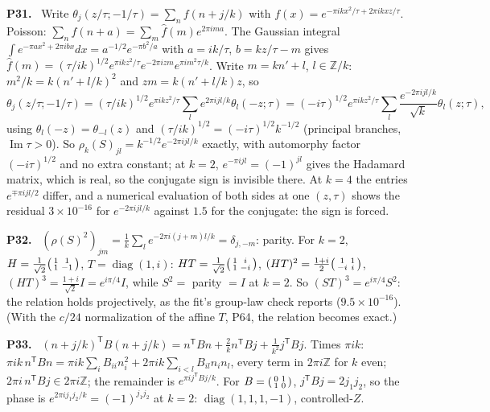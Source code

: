 \documentclass[11pt]{article}
\newcommand{\Z}{\mathbb{Z}}
\newenvironment{solution}[1]{\medskip\noindent\textbf{P#1.}\ }{\par\medskip}
\begin{document}
\begin{solution}{31}
Write $\theta_j(z/\tau;-1/\tau) = \sum_n f(n+j/k)$ with
$f(x) = e^{-\pi ikx^2/\tau + 2\pi ikxz/\tau}$. Poisson: $\sum_n f(n+a) = \sum_m\hat f(m)e^{2\pi ima}$.
The Gaussian integral $\int e^{-\pi ax^2+2\pi ibx}dx = a^{-1/2}e^{-\pi b^2/a}$ with
$a = ik/\tau$, $b = kz/\tau - m$ gives
$\hat f(m) = (\tau/ik)^{1/2}e^{\pi ikz^2/\tau}e^{-2\pi izm}e^{\pi im^2\tau/k}$.
Write $m = kn'+l$, $l\in\Z/k$: $m^2/k = k(n'+l/k)^2$ and $zm = k(n'+l/k)z$, so
\[
  \theta_j(z/\tau;-1/\tau) = (\tau/ik)^{1/2}e^{\pi ikz^2/\tau}\sum_l e^{2\pi ijl/k}\theta_l(-z;\tau)
  = (-i\tau)^{1/2}e^{\pi ikz^2/\tau}\sum_l \frac{e^{-2\pi ijl/k}}{\sqrt k}\theta_l(z;\tau),
\]
using $\theta_l(-z) = \theta_{-l}(z)$ and $(\tau/ik)^{1/2} = (-i\tau)^{1/2}k^{-1/2}$
(principal branches, $\operatorname{Im}\tau>0$). So $\rho_k(S)_{jl} = k^{-1/2}e^{-2\pi ijl/k}$
exactly, with automorphy factor $(-i\tau)^{1/2}$ and no extra constant; at $k=2$,
$e^{-\pi ijl} = (-1)^{jl}$ gives the Hadamard matrix, which is real, so the
conjugate sign is invisible there. At $k = 4$ the entries $e^{\mp\pi ijl/2}$
differ, and a numerical evaluation of both sides at one $(z,\tau)$ shows the
residual $3\times10^{-16}$ for $e^{-2\pi ijl/k}$ against $1.5$ for the
conjugate: the sign is forced.
\end{solution}

\begin{solution}{32}
$(\rho(S)^2)_{jm} = \frac1k\sum_l e^{-2\pi i(j+m)l/k} = \delta_{j,-m}$: parity.
For $k=2$, $H = \frac1{\sqrt2}\begin{psmallmatrix}1&1\\1&-1\end{psmallmatrix}$,
$T = \operatorname{diag}(1,i)$: $HT = \frac1{\sqrt2}\begin{psmallmatrix}1&i\\1&-i\end{psmallmatrix}$,
$(HT)^2 = \frac{1+i}{2}\begin{psmallmatrix}1&1\\-i&i\end{psmallmatrix}$,
$(HT)^3 = \frac{1+i}{\sqrt2}I = e^{i\pi/4}I$, while $S^2 = $ parity $= I$ at $k=2$.
So $(ST)^3 = e^{i\pi/4}S^2$: the relation holds projectively, as the fit's
group-law check reports ($9.5\times10^{-16}$). (With the $c/24$ normalization
of the affine $T$, P64, the relation becomes exact.)
\end{solution}

\begin{solution}{33}
$(n+j/k)^{\mathsf T}B(n+j/k) = n^{\mathsf T}Bn + \tfrac2k n^{\mathsf T}Bj + \tfrac1{k^2}j^{\mathsf T}Bj$.
Times $\pi ik$: $\pi ik\,n^{\mathsf T}Bn = \pi ik\sum_iB_{ii}n_i^2 + 2\pi ik\sum_{i<l}B_{il}n_in_l$,
every term in $2\pi i\Z$ for $k$ even; $2\pi i\,n^{\mathsf T}Bj\in2\pi i\Z$; the
remainder is $e^{\pi ij^{\mathsf T}Bj/k}$. For $B = \begin{psmallmatrix}0&1\\1&0\end{psmallmatrix}$,
$j^{\mathsf T}Bj = 2j_1j_2$, so the phase is $e^{2\pi ij_1j_2/k} = (-1)^{j_1j_2}$ at
$k=2$: $\operatorname{diag}(1,1,1,-1)$, controlled-$Z$.
\end{solution}
\end{document}
